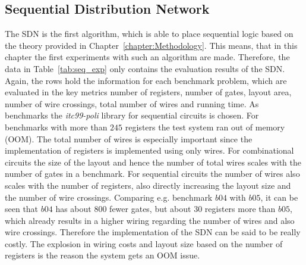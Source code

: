 \newpage
\subsection{Sequential Distribution Network}

The SDN is the first algorithm, which is able to place sequential logic based on the theory provided in Chapter~\ref{chapter:Methodology}. This means, that in this chapter the first experiments with such an algorithm are made. Therefore, the data in Table~\ref{tab:seq_exp} only contains the evaluation results of the SDN. Again, the rows hold the information for each benchmark problem, which are evaluated in the key metrics number of registers, number of gates, layout area, number of wire crossings, total number of wires and running time. As benchmarks the \textit{itc99-poli} \cite{itc_poli} library for sequential circuits is chosen. For benchmarks with more than $245$ registers the test system ran out of memory (OOM).
The total number of wires is especially important since the implementation of registers is implemented using only wires. For combinational circuits the size of the layout and hence the number of total wires scales with the number of gates in a benchmark. For sequential circuits the number of wires also scales with the number of registers, also directly increasing the layout size and the number of wire crossings. Comparing e.g. benchmark $b04$ with $b05$, it can be seen that $b04$ has about $800$ fewer gates, but about $30$ registers more than $b05$, which already results in a higher wiring regarding the number of wires and also wire crossings. Therefore the implementation of the SDN can be said to be really costly. The explosion in wiring costs and layout size based on the number of registers is the reason the system gets an OOM issue.


